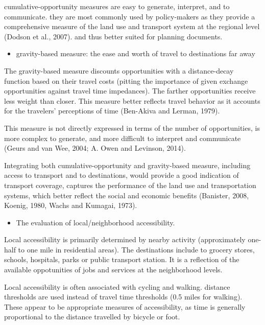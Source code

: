 \documentclass[12pt,]{article}
\providecommand{\tightlist}{%
  \setlength{\itemsep}{0pt}\setlength{\parskip}{0pt}}
\begin{document}
cumulative-opportunity measures are easy to generate, interpret, and to
communicate. they are most commonly used by policy-makers as they
provide a comprehensive measure of the land use and transport system at
the regional level (Dodson et al., 2007). and thus better suited for
planning documents.

\begin{itemize}
\tightlist
\item
  gravity-based measure: the ease and worth of travel to destinations
  far away
\end{itemize}

The gravity-based measure discounts opportunities with a distance-decay
function based on their travel costs (pitting the importance of given
exchange opportunities against travel time impedances). The farther
opportunities receive less weight than closer. This measure better
reflects travel behavior as it accounts for the travelers' perceptions
of time (Ben-Akiva and Lerman, 1979).

This measure is not directly expressed in terms of the number of
opportunities, is more complex to generate, and more difficult to
interpret and communicate (Geurs and van Wee, 2004; A. Owen and
Levinson, 2014).

Integrating both cumulative-opportunity and gravity-based measure,
including access to transport and to destinations, would provide a good
indication of transport coverage, captures the performance of the land
use and transportation systems, which better reflect the social and
economic benefits (Banister, 2008, Koenig, 1980, Wachs and Kumagai,
1973).

\begin{itemize}
\tightlist
\item
  The evaluation of local/neighborhood accessibility.
\end{itemize}

Local accessibility is primarily determined by nearby activity
(approximately one-half to one mile in residential areas). The
destinations include to grocery stores, schools, hospitals, parks or
public transport station. It is a reflection of the available
oppotunities of jobs and services at the neighborhood levels.

Local accessibility is often associated with cycling and walking.
distance thresholds are used instead of travel time thresholds (0.5
miles for walking). These appear to be appropriate measures of
accessibility, as time is generally proportional to the distance
travelled by bicycle or foot.
\end{document}
